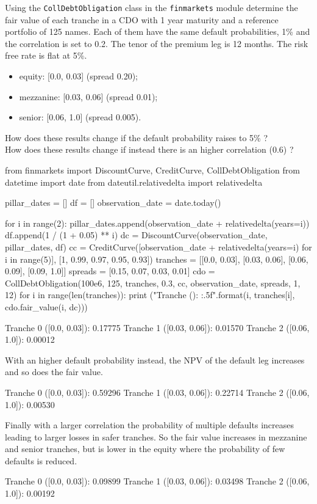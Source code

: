 \begin{question}
Using the \texttt{CollDebtObligation} class in the \texttt{finmarkets} module determine the fair value of each tranche in a CDO with 1 year maturity and a reference portfolio of 125 names. Each of them have the same default probabilities, 1\% and the correlation is set to 0.2. The tenor of the premium leg is 12 months. The risk free rate is flat at 5\%.
\begin{itemize}
	\item equity: [0.0, 0.03] (spread 0.20);
	\item mezzanine: [0.03, 0.06] (spread 0.01);
	\item senior: [0.06, 1.0] (spread 0.005).
\end{itemize}
How does these results change if the default probability raises to 5\% ? \\
How does these results change if instead there is an higher correlation (0.6) ?
\end{question}

\cprotEnv\begin{solution}

\begin{ipython}
from finmarkets import DiscountCurve, CreditCurve, CollDebtObligation
from datetime import date
from dateutil.relativedelta import relativedelta

pillar_dates = []
df = []
observation_date = date.today()

for i in range(2):
    pillar_dates.append(observation_date + relativedelta(years=i))
    df.append(1 / (1 + 0.05) ** i)
    dc = DiscountCurve(observation_date, pillar_dates, df)
cc = CreditCurve([observation_date + relativedelta(years=i) for i in range(5)],
    [1, 0.99, 0.97, 0.95, 0.93])
tranches = [[0.0, 0.03], [0.03, 0.06], [0.06, 0.09], [0.09, 1.0]]
spreads = [0.15, 0.07, 0.03, 0.01]
cdo = CollDebtObligation(100e6, 125, tranches, 0.3, cc,
    observation_date, spreads, 1, 12)
for i in range(len(tranches)):
    print ("Tranche {} ({}): {:.5f}".format(i, tranches[i], cdo.fair_value(i, dc)))
\end{ipython}
\begin{ioutput}
Tranche 0 ([0.0, 0.03]): 0.17775
Tranche 1 ([0.03, 0.06]): 0.01570
Tranche 2 ([0.06, 1.0]): 0.00012
\end{ioutput}
With an higher default probability instead, the NPV of the default leg increases and so does the fair value.

\begin{ioutput}
Tranche 0 ([0.0, 0.03]): 0.59296
Tranche 1 ([0.03, 0.06]): 0.22714
Tranche 2 ([0.06, 1.0]): 0.00530
\end{ioutput}
Finally with a larger correlation the probability of multiple defaults increases leading to larger losses in safer tranches. So the fair value increases in mezzanine and senior tranches, but is lower in the equity where the probability of few defaults is reduced.

\begin{ioutput}
Tranche 0 ([0.0, 0.03]): 0.09899
Tranche 1 ([0.03, 0.06]): 0.03498
Tranche 2 ([0.06, 1.0]): 0.00192
\end{ioutput}
\end{solution}
